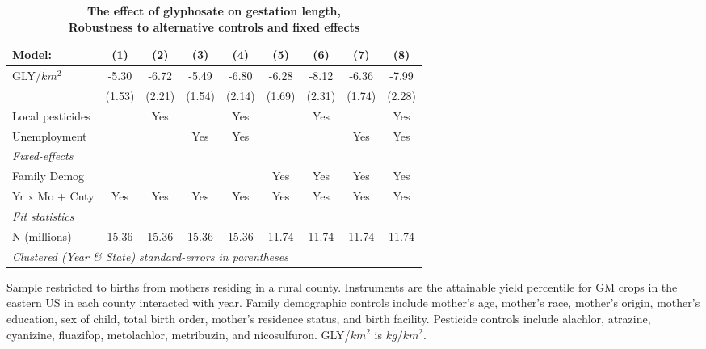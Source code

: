 \begin{table}[htbp]
   \centering
   \small
   \begin{threeparttable}[b]
      \caption{\label{tab:robust-cntrl-gestation-e100myielddiffpercentilegmo} \textbf{The effect of glyphosate on gestation length, \\ Robustness to alternative controls and fixed effects}}
      \begin{tabular}{lcccccccc}
         \toprule
         Model:           & (1)    & (2)    & (3)    & (4)    & (5)    & (6)    & (7)    & (8)\\  
         \midrule 
         GLY/$km^2$       & -5.30  & -6.72  & -5.49  & -6.80  & -6.28  & -8.12  & -6.36  & -7.99\\   
                          & (1.53) & (2.21) & (1.54) & (2.14) & (1.69) & (2.31) & (1.74) & (2.28)\\   
         Local pesticides &        & Yes    &        & Yes    &        & Yes    &        & Yes\\  
         Unemployment     &        &        & Yes    & Yes    &        &        & Yes    & Yes\\  
         \midrule
         \emph{Fixed-effects}\\
         Family Demog     &        &        &        &        & Yes    & Yes    & Yes    & Yes\\  
         Yr x Mo + Cnty   & Yes    & Yes    & Yes    & Yes    & Yes    & Yes    & Yes    & Yes\\  
         \midrule
         \emph{Fit statistics}\\
         N (millions)     & 15.36  & 15.36  & 15.36  & 15.36  & 11.74  & 11.74  & 11.74  & 11.74\\  
         \midrule
         \multicolumn{9}{l}{\emph{Clustered (Year \& State) standard-errors in parentheses}}\\
      \end{tabular}
      
      \begin{tablenotes}\item Sample restricted to births from mothers residing in a rural county. Instruments are the attainable yield percentile for GM crops in the eastern US in each county interacted with year. Family demographic controls include mother's age, mother's race, mother's origin, mother's education, sex of child, total birth order, mother's residence status, and birth facility. Pesticide controls include alachlor, atrazine, cyanizine, fluazifop, metolachlor, metribuzin, and nicosulfuron. GLY/$km^2$ is $kg/km^2$.
      \end{tablenotes}
   \end{threeparttable}
\end{table}
